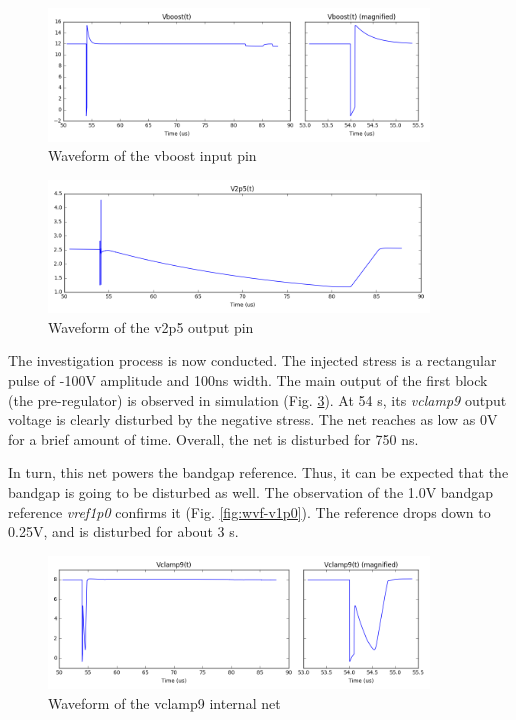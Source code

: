 \begin{figure}[!htbp]
  \centering
  \includegraphics[width=0.9\textwidth]{src/3/figures/vboost.png}
  \caption{Waveform of the vboost input pin}
  \label{fig:wvf-vboost}
\end{figure}

\begin{figure}[!htbp]
  \centering
  \includegraphics[width=0.9\textwidth]{src/3/figures/v2p5.png}
  \caption{Waveform of the v2p5 output pin}
  \label{fig:wvf-v2p5}
\end{figure}

The investigation process is now conducted.
The injected stress is a rectangular pulse of -100V amplitude and 100ns width.
The main output of the first block (the pre-regulator) is observed in simulation (Fig. \ref{fig:wvf-vclamp9}).
At 54 \textmugreek{}s, its \textit{vclamp9} output voltage is clearly disturbed by the negative stress.
The net reaches as low as 0V for a brief amount of time.
Overall, the net is disturbed for 750 ns.

In turn, this net powers the bandgap reference.
Thus, it can be expected that the bandgap is going to be disturbed as well.
The observation of the 1.0V bandgap reference \textit{vref1p0} confirms it (Fig. \ref{fig:wvf-v1p0}).
The reference drops down to 0.25V, and is disturbed for about 3 \textmugreek{}s.

\begin{figure}[!htbp]
  \centering
  \includegraphics[width=0.9\textwidth]{src/3/figures/vclamp9.png}
  \caption{Waveform of the vclamp9 internal net}
  \label{fig:wvf-vclamp9}
\end{figure}

